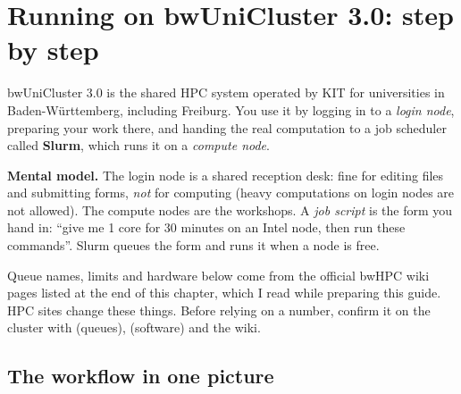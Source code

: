 \chapter{Running on bwUniCluster 3.0: step by step}\label{ch:cluster}

bwUniCluster 3.0 is the shared HPC system operated by KIT for universities in Baden-W\"urttemberg, including Freiburg. You use it by logging in to a \emph{login node}, preparing your work there, and handing the real computation to a job scheduler called \textbf{Slurm}, which runs it on a \emph{compute node}.

\begin{plain}
\textbf{Mental model.} The login node is a shared reception desk: fine for editing files and submitting forms, \emph{not} for computing (heavy computations on login nodes are not allowed). The compute nodes are the workshops. A \emph{job script} is the form you hand in: ``give me 1 core for 30 minutes on an Intel node, then run these commands''. Slurm queues the form and runs it when a node is free.
\end{plain}

\begin{warn}
Queue names, limits and hardware below come from the official bwHPC wiki pages listed at the end of this chapter, which I read while preparing this guide. HPC sites change these things. Before relying on a number, confirm it on the cluster with  (queues),  (software) and the wiki.
\end{warn}

\section{The workflow in one picture}

\begin{center}
\end{center}

